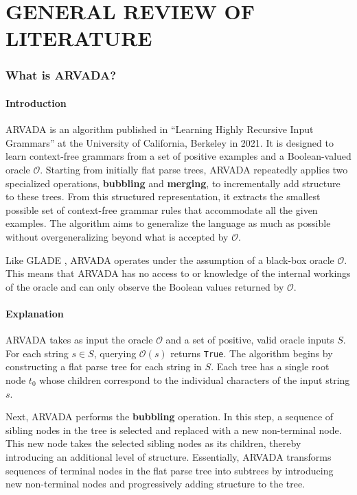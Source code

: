 \chapter{GENERAL REVIEW OF LITERATURE}

\subsection{What is ARVADA?}

\subsubsection{Introduction}

ARVADA is an algorithm published in \enquote{Learning Highly Recursive Input Grammars} \cite{kulkarniLearningHighlyRecursive2021} at the University of California, Berkeley in 2021. It is designed to learn context-free grammars from a set of positive examples and a Boolean-valued oracle $\mathcal{O}$. Starting from initially flat parse trees, ARVADA repeatedly applies two specialized operations, \textbf{bubbling} and \textbf{merging}, to incrementally add structure to these trees. From this structured representation, it extracts the smallest possible set of context-free grammar rules that accommodate all the given examples. The algorithm aims to generalize the language as much as possible without overgeneralizing beyond what is accepted by $\mathcal{O}$.

Like GLADE \cite{bastaniSynthesizingProgramInput}, ARVADA operates under the assumption of a black-box oracle $\mathcal{O}$. This means that ARVADA has no access to or knowledge of the internal workings of the oracle and can only observe the Boolean values returned by $\mathcal{O}$.

\subsubsection{Explanation}

ARVADA takes as input the oracle $\mathcal{O}$ and a set of positive, valid oracle inputs $S$. For each string $s \in S$, querying $\mathcal{O}(s)$ returns \verb|True|. The algorithm begins by constructing a flat parse tree for each string in $S$. Each tree has a single root node $t_0$ whose children correspond to the individual characters of the input string $s$.

Next, ARVADA performs the \textbf{bubbling} operation. In this step, a sequence of sibling nodes in the tree is selected and replaced with a new non-terminal node. This new node takes the selected sibling nodes as its children, thereby introducing an additional level of structure. Essentially, ARVADA transforms sequences of terminal nodes in the flat parse tree into subtrees by introducing new non-terminal nodes and progressively adding structure to the tree.

